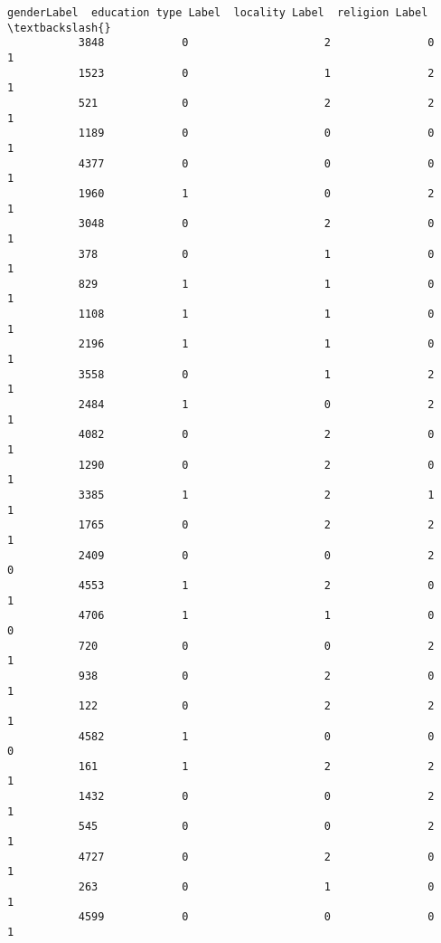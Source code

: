 \documentclass[11pt]{article}
\begin{document}
\begin{Verbatim}[commandchars=\\\{\}]
                 genderLabel  education type Label  locality Label  religion Label  \textbackslash{}
           3848            0                     2               0               1   
           1523            0                     1               2               1   
           521             0                     2               2               1   
           1189            0                     0               0               1   
           4377            0                     0               0               1   
           1960            1                     0               2               1   
           3048            0                     2               0               1   
           378             0                     1               0               1   
           829             1                     1               0               1   
           1108            1                     1               0               1   
           2196            1                     1               0               1   
           3558            0                     1               2               1   
           2484            1                     0               2               1   
           4082            0                     2               0               1   
           1290            0                     2               0               1   
           3385            1                     2               1               1   
           1765            0                     2               2               1   
           2409            0                     0               2               0   
           4553            1                     2               0               1   
           4706            1                     1               0               0   
           720             0                     0               2               1   
           938             0                     2               0               1   
           122             0                     2               2               1   
           4582            1                     0               0               0   
           161             1                     2               2               1   
           1432            0                     0               2               1   
           545             0                     0               2               1   
           4727            0                     2               0               1   
           263             0                     1               0               1   
           4599            0                     0               0               1   

\end{Verbatim}
\end{document}

